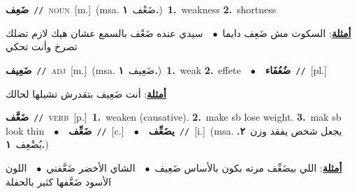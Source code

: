 \documentclass[10pt,a4paper,twoside]{article} %
\begin{document}
\begin{multicols}{2}
{\setlength\topsep{0pt}\textbf{\foreignlanguage{arabic}{ضَعِف}}\ {\color{gray}\texttt{//}\color{black}}\ \textsc{noun}\ [m.]\ \color{gray}(msa. \foreignlanguage{arabic}{ضَعْف}~\foreignlanguage{arabic}{\textbf{١.}})\color{black}\ \textbf{1.}~weakness  \textbf{2.}~shortness\  \begin{flushright}\color{gray}\foreignlanguage{arabic}{\textbf{\underline{\foreignlanguage{arabic}{أمثلة}}}: السكوت مش ضَعِف دايما\ $\bullet$\ \  سيدي عنده ضَعْف بالسمع عشان هيك لازم تضلك تصرخ وأنت تحكي}\end{flushright}\color{black}} \vspace{2mm}

{\setlength\topsep{0pt}\textbf{\foreignlanguage{arabic}{ضَعِيف}}\ {\color{gray}\texttt{//}\color{black}}\ \textsc{adj}\ [m.]\ \color{gray}(msa. \foreignlanguage{arabic}{ضَعِيف}~\foreignlanguage{arabic}{\textbf{١.}})\color{black}\ \textbf{1.}~weak  \textbf{2.}~effete\ \ $\bullet$\ \ \setlength\topsep{0pt}\textbf{\foreignlanguage{arabic}{ضُعُفَاء}}\ {\color{gray}\texttt{//}\color{black}}\ [pl.]\  \begin{flushright}\color{gray}\foreignlanguage{arabic}{\textbf{\underline{\foreignlanguage{arabic}{أمثلة}}}: أنت ضَعِيف بتقدرش تشيلها لحالك}\end{flushright}\color{black}} \vspace{2mm}

{\setlength\topsep{0pt}\textbf{\foreignlanguage{arabic}{ضَعَّف}}\ {\color{gray}\texttt{//}\color{black}}\ \textsc{verb}\ [p.]\ \textbf{1.}~weaken (causative).  \textbf{2.}~make sb lose weight.  \textbf{3.}~mak sb look thin\ \ $\bullet$\ \ \setlength\topsep{0pt}\textbf{\foreignlanguage{arabic}{ضَعِّف}}\ {\color{gray}\texttt{//}\color{black}}\ [c.]\ \ $\bullet$\ \ \setlength\topsep{0pt}\textbf{\foreignlanguage{arabic}{يضَعِّف}}\ {\color{gray}\texttt{//}\color{black}}\ [i.]\ \color{gray}(msa. \foreignlanguage{arabic}{يجعل شخص يفقد وزن}~\foreignlanguage{arabic}{\textbf{٢.}}  \foreignlanguage{arabic}{يُضْعِف}~\foreignlanguage{arabic}{\textbf{١.}})\color{black}\  \begin{flushright}\color{gray}\foreignlanguage{arabic}{\textbf{\underline{\foreignlanguage{arabic}{أمثلة}}}: اللي بيضَعِّف مرته بكون بالأساس ضَعِيف\ $\bullet$\ \  الشاي الأخضر ضَعَّفني\ $\bullet$\ \  اللون الأسود ضَعَّفها كثير بالحفلة}\end{flushright}\color{black}} \vspace{2mm}


\end{multicols}
\end{document}
